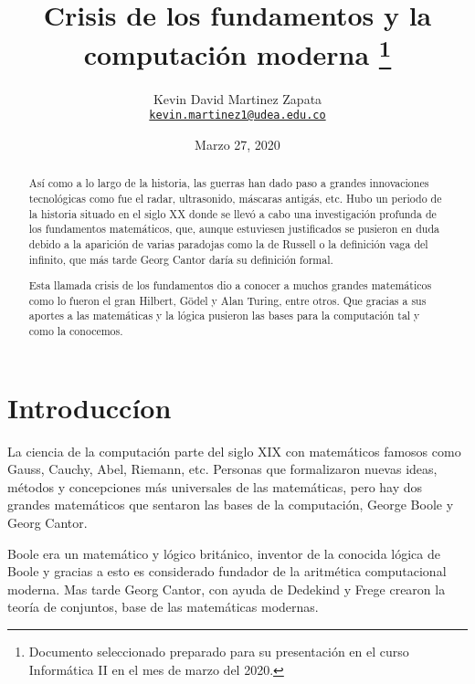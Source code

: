 \documentclass[11pt]{article}
\title{Crisis de los fundamentos y la computación moderna
\thanks{Documento seleccionado preparado para su presentación en el curso Informática II en el mes de marzo del 2020.}
}
\author{Kevin David Martinez Zapata\\%
    \href{mailto:kevin.martinez1@udea.edu.co}{\texttt{kevin.martinez1@udea.edu.co}}
    }
\date{Marzo 27, 2020}
\begin{document}
{
\maketitle
\begin{abstract}

Así como a lo largo de la historia, las guerras han dado paso a grandes innovaciones tecnológicas como fue el radar, ultrasonido, máscaras antigás, etc. Hubo un periodo de la historia situado en el siglo XX donde se llevó a cabo una investigación profunda de los fundamentos matemáticos, que, aunque estuviesen justificados se pusieron en duda debido a la aparición de varias paradojas como la de Russell o la definición vaga del infinito, que más tarde Georg Cantor daría su definición formal.

Esta llamada crisis de los fundamentos dio a conocer a muchos grandes matemáticos como lo fueron el gran Hilbert, Gödel y Alan Turing, entre otros. Que gracias a sus aportes a las matemáticas y la lógica pusieron las bases para la computación tal y como la conocemos.

\citet{LaGaceta}

\end{abstract}
}


\section{Introduccíon}
La ciencia de la computación parte del siglo XIX con matemáticos famosos como Gauss, Cauchy, Abel, Riemann, etc. Personas que formalizaron nuevas ideas, métodos y concepciones más universales de las matemáticas, pero hay dos grandes matemáticos que sentaron las bases de la computación, George Boole y Georg Cantor.

Boole era un matemático y lógico británico, inventor de la conocida lógica de Boole y gracias a esto es considerado fundador de la aritmética computacional moderna. Mas tarde Georg Cantor, con ayuda de Dedekind y Frege crearon la teoría de conjuntos, base de las matemáticas modernas.
\end{document}
